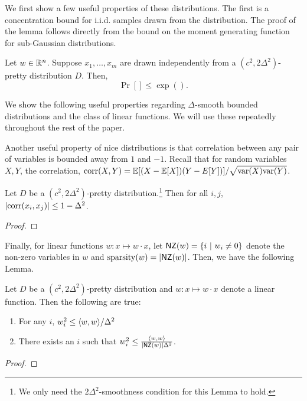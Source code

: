 We first show a few useful properties of these distributions. The first is a
concentration bound for i.i.d. samples drawn from the distribution. The proof of
the lemma follows directly from the bound on the moment generating function for
sub-Gaussian distributions.
\begin{lemma}
Let $w \in \mathbb{R}^n$. Suppose $x_1, \ldots, x_m$ are drawn independently from
a $(c^2, 2 \Delta^2)$-pretty distribution $D$. Then,
\[ 
\Pr[ ] \leq \exp( ).
\]
\end{lemma}

We show the following useful properties regarding $\Delta$-smooth bounded
distributions and the class of linear functions. We will use these repeatedly
throughout the rest of the paper.

Another useful property of nice distributions is that correlation between any
pair of variables is bounded away from $1$ and $-1$.  Recall that for random
variables $X, Y$, the correlation, $\mathrm{corr}(X, Y) = \mathbb{E}[(X - \mathbb{E}[X]) (Y -
E[Y])]/\sqrt{\mathrm{var}(X) \mathrm{var}(Y)}$. 

\begin{lemma} Let $D$ be a $(c^2, 2 \Delta^2)$-pretty distribution.\footnote{We
only need the $2 \Delta^2$-smoothness condition for this Lemma to hold.} Then
for all $i, j$, $|\mathrm{corr}(x_i, x_j)| \leq 1 - \Delta^2$.
\end{lemma}
\begin{proof}

\end{proof}

Finally, for linear functions $w : x \mapsto w \cdot x$, let $\mathsf{NZ}(w) = \{ i ~|~
w_i \neq 0 \}$ denote the non-zero variables in $w$ and $\mathrm{sparsity}(w) =
|\mathsf{NZ}(w)|$. Then, we have the following Lemma.

\begin{lemma} Let $D$ be a $(c^2, 2 \Delta^2)$-pretty distribution and $w : x
\mapsto w \cdot x$ denote a linear function. Then the following are true:
\begin{enumerate}
\item For any $i$, $w^2_i \leq \langle w, w \rangle/\Delta^2$
\item There exists an $i$ such that $w^2_i \leq \frac{\langle w, w \rangle}{|\mathsf{NZ}(w)| \Delta^2}$.
\end{enumerate}
\end{lemma}
\begin{proof}

\end{proof}
